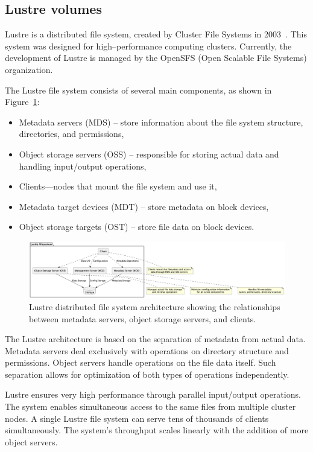 \subsection{Lustre volumes}\label{subsec:lustre-volumes}

Lustre is a distributed file system, created by Cluster File Systems in 2003~\cite{lustre_fs}.
This system was designed for high--performance computing clusters.
Currently, the development of Lustre is managed by the OpenSFS (Open Scalable File Systems) organization.

The Lustre file system consists of several main components, as shown in Figure~\ref{fig:lustre-arch}:
\begin{itemize}
    \item Metadata servers (MDS) -- store information about the file system structure, directories, and permissions,
    \item Object storage servers (OSS) -- responsible for storing actual data and handling input/output operations,
    \item Clients—nodes that mount the file system and use it,
    \item Metadata target devices (MDT) -- store metadata on block devices,
    \item Object storage targets (OST) -- store file data on block devices.
\end{itemize}

\begin{figure}[htbp]
    \centering
    \includegraphics[width=\textwidth]{images/lustre}
    \caption{Lustre distributed file system architecture showing the relationships between metadata servers, object storage servers, and clients.}
    \label{fig:lustre-arch}
\end{figure}

The Lustre architecture is based on the separation of metadata from actual data.
Metadata servers deal exclusively with operations on directory structure and permissions.
Object servers handle operations on the file data itself.
Such separation allows for optimization of both types of operations independently.

Lustre ensures very high performance through parallel input/output operations.
The system enables simultaneous access to the same files from multiple cluster nodes.
A single Lustre file system can serve tens of thousands of clients simultaneously.
The system's throughput scales linearly with the addition of more object servers.

